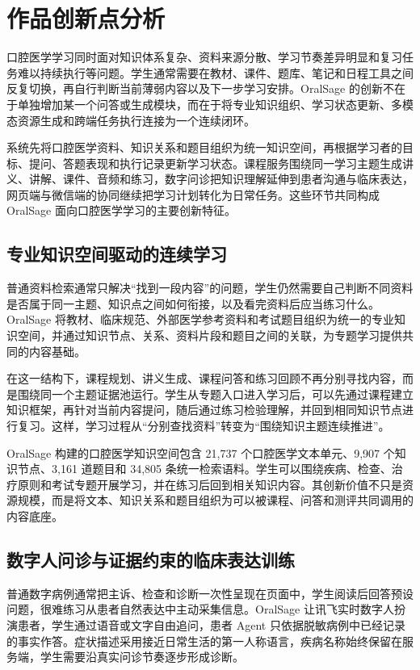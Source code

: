 
\chapter{作品创新点分析}
\label{sec:innovation}

口腔医学学习同时面对知识体系复杂、资料来源分散、学习节奏差异明显和复习任务难以持续执行等问题。学生通常需要在教材、课件、题库、笔记和日程工具之间反复切换，再自行判断当前薄弱内容以及下一步学习安排。OralSage 的创新不在于单独增加某一个问答或生成模块，而在于将专业知识组织、学习状态更新、多模态资源生成和跨端任务执行连接为一个连续闭环。

系统先将口腔医学资料、知识关系和题目组织为统一知识空间，再根据学习者的目标、提问、答题表现和执行记录更新学习状态。课程服务围绕同一学习主题生成讲义、讲解、课件、音频和练习，数字问诊把知识理解延伸到患者沟通与临床表达，网页端与微信端的协同继续把学习计划转化为日常任务。这些环节共同构成 OralSage 面向口腔医学学习的主要创新特征。

\section{专业知识空间驱动的连续学习}

普通资料检索通常只解决“找到一段内容”的问题，学生仍然需要自己判断不同资料是否属于同一主题、知识点之间如何衔接，以及看完资料后应当练习什么。OralSage 将教材、临床规范、外部医学参考资料和考试题目组织为统一的专业知识空间，并通过知识节点、关系、资料片段和题目之间的关联，为专题学习提供共同的内容基础。

在这一结构下，课程规划、讲义生成、课程问答和练习回顾不再分别寻找内容，而是围绕同一个主题证据池运行。学生从专题入口进入学习后，可以先通过课程建立知识框架，再针对当前内容提问，随后通过练习检验理解，并回到相同知识节点进行复习。这样，学习过程从“分别查找资料”转变为“围绕知识主题连续推进”。

OralSage 构建的口腔医学知识空间包含 21,737 个口腔医学文本单元、9,907 个知识节点、3,161 道题目和 34,805 条统一检索语料。学生可以围绕疾病、检查、治疗原则和考试专题开展学习，并在练习后回到相关知识内容。其创新价值不只是资源规模，而是将文本、知识关系和题目组织为可以被课程、问答和测评共同调用的内容底座。

\section{数字人问诊与证据约束的临床表达训练}

普通数字病例通常把主诉、检查和诊断一次性呈现在页面中，学生阅读后回答预设问题，很难练习从患者自然表达中主动采集信息。OralSage 让讯飞实时数字人扮演患者，学生通过语音或文字自由追问，患者 Agent 只依据脱敏病例中已经记录的事实作答。症状描述采用接近日常生活的第一人称语言，疾病名称始终保留在服务端，学生需要沿真实问诊节奏逐步形成诊断。

